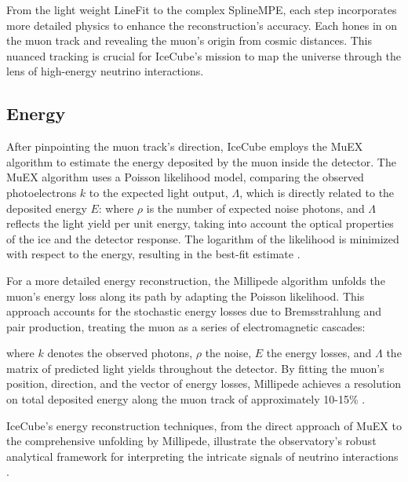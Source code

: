 From the light weight LineFit to the complex SplineMPE, each step incorporates more detailed physics to enhance the reconstruction's accuracy.
Each hones in on the muon track and revealing the muon's origin from cosmic distances.
This nuanced tracking is crucial for IceCube's mission to map the universe through the lens of high-energy neutrino interactions.

\subsection{Energy}

After pinpointing the muon track's direction, IceCube employs the MuEX algorithm to estimate the energy deposited by the muon inside the detector.
The MuEX algorithm uses a Poisson likelihood model, comparing the observed photoelectrons $k$ to the expected light output, $\Lambda$, which is directly related to the deposited energy $E$:
\muEXLLH
where $\rho$ is the number of expected noise photons, and $\Lambda$ reflects the light yield per unit energy, taking into account the optical properties of the ice and the detector response.
The logarithm of the likelihood is minimized with respect to the energy, resulting in the best-fit estimate \cite{IC3_energyReco}.

For a more detailed energy reconstruction, the Millipede algorithm unfolds the muon's energy loss along its path by adapting the Poisson likelihood.
This approach accounts for the stochastic energy losses due to Bremsstrahlung and pair production, treating the muon as a series of electromagnetic cascades:
\vecMULLH
\LLHwithspice

where $k$ denotes the observed photons, $\rho$ the noise, $E$ the energy losses, and \textbf{$\Lambda$} the matrix of predicted light yields throughout the detector.
By fitting the muon's position, direction, and the vector of energy losses, Millipede achieves a resolution on total deposited energy along the muon track of approximately 10-15\% \cite{IC3_energyReco}.

IceCube's energy reconstruction techniques, from the direct approach of MuEX to the comprehensive unfolding by Millipede, illustrate the observatory's robust analytical framework for interpreting the intricate signals of neutrino interactions \cite{IC3_energyReco}.

